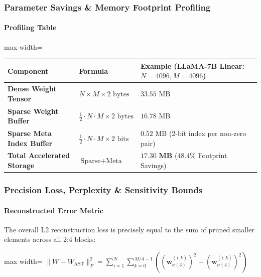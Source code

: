 \subsubsection*{Parameter Savings \& Memory Footprint Profiling}

\paragraph{Profiling Table}

\begin{center}
\begin{adjustbox}{max width=\columnwidth}
\renewcommand{\arraystretch}{1.2}
\begin{tabular}{lll}
\toprule
Component & Formula & Example (LLaMA-7B Linear: $N=4096, M=4096$) \\
\midrule
\textbf{Dense Weight Tensor} & $N \times M \times 2 \text{ bytes}$ & $33.55 \text{ MB}$ \\
\textbf{Sparse Weight Buffer} & $\frac{1}{2} \cdot N \cdot M \times 2 \text{ bytes}$ & $16.78 \text{ MB}$ \\
\textbf{Sparse Meta Index Buffer} & $\frac{1}{2} \cdot N \cdot M \times 2 \text{ bits}$ & $0.52 \text{ MB}$ (2-bit index per non-zero pair) \\
\textbf{Total Accelerated Storage} & $\text{Sparse} + \text{Meta}$ & $\mathbf{17.30\text{ MB}}$ ($48.4\%$ Footprint Savings) \\

\bottomrule
\end{tabular}
\end{adjustbox}
\end{center}

\subsubsection*{Precision Loss, Perplexity \& Sensitivity Bounds}

\paragraph{Reconstructed Error Metric}

The overall L2 reconstruction loss is precisely equal to the sum of pruned smaller elements across all 2:4 blocks:

\begin{center}
\begin{adjustbox}{max width=\columnwidth}
$\displaystyle
\| W - W_{\text{AST}} \|_F^2 = \sum_{i=1}^N \sum_{k=0}^{M/4 - 1} \left( \left( \mathbf{w}_{\sigma(3)}^{(i, k)} \right)^2 + \left( \mathbf{w}_{\sigma(4)}^{(i, k)} \right)^2 \right)
$
\end{adjustbox}
\end{center}

